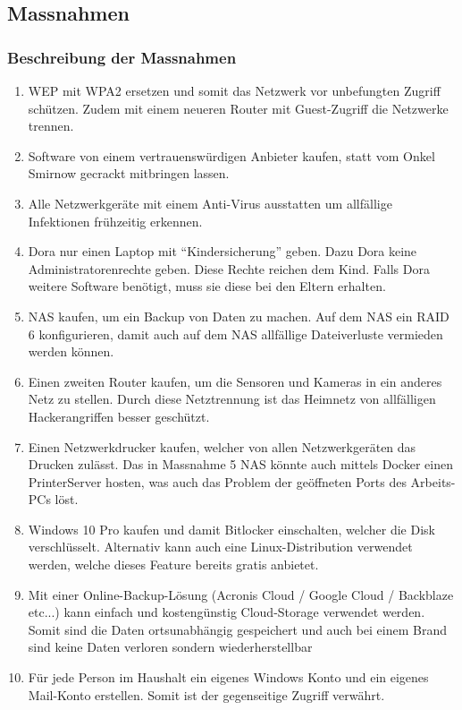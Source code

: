 

\subsection{Massnahmen}

\subsubsection{Beschreibung der Massnahmen}
\begin{enumerate}

\item WEP mit WPA2 ersetzen und somit das Netzwerk vor unbefungten Zugriff schützen. Zudem mit einem neueren Router mit Guest-Zugriff die Netzwerke trennen.

\item Software von einem vertrauenswürdigen Anbieter kaufen, statt vom Onkel Smirnow gecrackt mitbringen lassen.

\item Alle Netzwerkgeräte mit einem Anti-Virus ausstatten um allfällige Infektionen frühzeitig erkennen.

\item Dora nur einen Laptop mit “Kindersicherung” geben. Dazu Dora keine Administratorenrechte geben. Diese Rechte reichen dem Kind. Falls Dora weitere Software benötigt, muss sie diese bei den Eltern erhalten.

\item NAS kaufen, um ein Backup von Daten zu machen. Auf dem NAS ein RAID 6 konfigurieren, damit auch auf dem NAS allfällige Dateiverluste vermieden werden können.

\item Einen zweiten Router kaufen, um die Sensoren und Kameras in ein anderes Netz
zu stellen. Durch diese Netztrennung ist das Heimnetz von allfälligen Hackerangriffen
besser geschützt.



\item Einen Netzwerkdrucker kaufen, welcher von allen Netzwerkgeräten das Drucken zulässt. Das in Massnahme 5 NAS könnte auch mittels Docker einen PrinterServer hosten, was auch das Problem der geöffneten Ports des Arbeits-PCs löst.


\item Windows 10 Pro kaufen und damit Bitlocker einschalten, welcher die Disk verschlüsselt. Alternativ kann auch eine Linux-Distribution verwendet werden, welche dieses Feature bereits gratis anbietet.

\item Mit einer Online-Backup-Lösung (Acronis Cloud / Google Cloud / Backblaze etc...) kann einfach und kostengünstig Cloud-Storage verwendet werden. Somit sind die Daten ortsunabhängig gespeichert und auch bei einem Brand sind keine Daten verloren sondern wiederherstellbar


\item Für jede Person im Haushalt ein eigenes Windows Konto und ein eigenes Mail-Konto erstellen. Somit ist der gegenseitige Zugriff verwährt. 




\end{enumerate}

